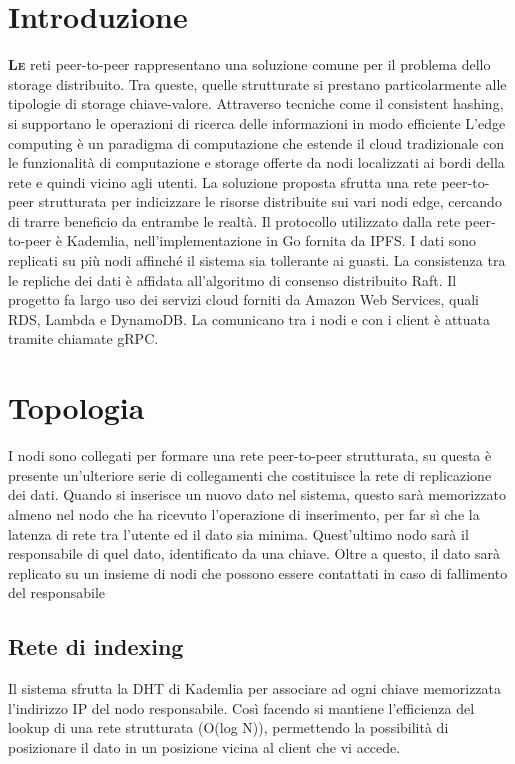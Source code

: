 \documentclass[conference]{IEEEtran}
\begin{document}
\section{Introduzione}
\lettrine{\textbf{L}}{\textbf{e}} reti peer-to-peer rappresentano una soluzione comune per il problema dello storage distribuito.
Tra queste, quelle strutturate si prestano particolarmente alle tipologie di storage chiave-valore.
Attraverso tecniche come il consistent hashing, si supportano le operazioni di ricerca delle informazioni in modo efficiente %
L'edge computing è un paradigma di computazione che estende il cloud tradizionale con le funzionalità di computazione e
storage offerte da nodi localizzati ai bordi della rete e quindi vicino agli utenti. La soluzione proposta sfrutta una
rete peer-to-peer strutturata per indicizzare le risorse distribuite sui vari nodi edge, cercando di trarre beneficio da entrambe le realtà.
Il protocollo utilizzato dalla rete peer-to-peer è Kademlia,%
nell'implementazione in Go fornita da IPFS. I dati sono replicati su più nodi affinché il sistema sia tollerante ai guasti.
La consistenza tra le repliche dei dati è affidata all'algoritmo di consenso distribuito Raft\cite{raft}\cite{raftGolang}. %
Il progetto fa largo uso dei servizi cloud forniti da Amazon Web Services, quali RDS, Lambda e DynamoDB.
La comunicano tra i nodi e con i client è attuata tramite chiamate gRPC.

\section{Topologia}
I nodi sono collegati per formare una rete peer-to-peer strutturata, su questa è presente un'ulteriore serie di collegamenti
che costituisce la rete di replicazione dei dati. Quando si inserisce un nuovo dato nel sistema, questo sarà memorizzato
almeno nel nodo che ha ricevuto l'operazione di inserimento, per far sì che la latenza di rete tra l'utente ed il dato sia minima.
Quest'ultimo nodo sarà il responsabile di quel dato, identificato da una chiave. Oltre a questo, il dato sarà replicato
su un insieme di nodi che possono essere contattati in caso di fallimento del responsabile

\subsection{Rete di indexing}
Il sistema sfrutta la DHT di Kademlia per associare ad ogni chiave memorizzata l'indirizzo IP del nodo responsabile.
Così facendo si mantiene l'efficienza del lookup di una rete strutturata (O(log N)), permettendo la possibilità di posizionare
il dato in un posizione vicina al client che vi accede.
\end{document}
